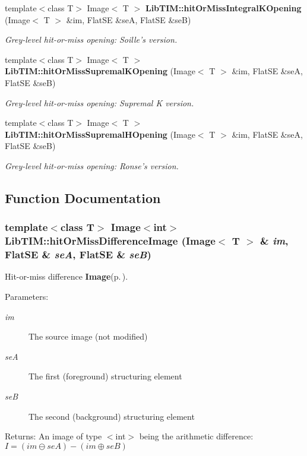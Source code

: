 \begin{CompactItemize}
template$<$class T$>$ Image$<$ T $>$ {\bf Lib\-TIM::hit\-Or\-Miss\-Integral\-KOpening} (Image$<$ T $>$ \&im, Flat\-SE \&se\-A, Flat\-SE \&se\-B)
\begin{CompactList}\small\item\em Grey-level hit-or-miss opening: Soille's version. \item\end{CompactList}\item 
template$<$class T$>$ Image$<$ T $>$ {\bf Lib\-TIM::hit\-Or\-Miss\-Supremal\-KOpening} (Image$<$ T $>$ \&im, Flat\-SE \&se\-A, Flat\-SE \&se\-B)
\begin{CompactList}\small\item\em Grey-level hit-or-miss opening: Supremal K version. \item\end{CompactList}\item 
template$<$class T$>$ Image$<$ T $>$ {\bf Lib\-TIM::hit\-Or\-Miss\-Supremal\-HOpening} (Image$<$ T $>$ \&im, Flat\-SE \&se\-A, Flat\-SE \&se\-B)
\begin{CompactList}\small\item\em Grey-level hit-or-miss opening: Ronse's version. \item\end{CompactList}\end{CompactItemize}


\subsection{Function Documentation}
\subsubsection{\setlength{\rightskip}{0pt plus 5cm}template$<$class T$>$ Image$<$int$>$ Lib\-TIM::hit\-Or\-Miss\-Difference\-Image (Image$<$ T $>$ \& {\em im}, Flat\-SE \& {\em se\-A}, Flat\-SE \& {\em se\-B})}\label{group__interval_ga0}


Hit-or-miss difference {\bf Image}{\rm (p.\,\pageref{classLibTIM_1_1Image})}. 

\begin{Desc}
\item[Parameters:]
\begin{description}
\item[{\em im}]The source image (not modified) \item[{\em se\-A}]The first (foreground) structuring element \item[{\em se\-B}]The second (background) structuring element \end{description}
\end{Desc}
\begin{Desc}
\item[Returns:]An image of type $<$int$>$ being the arithmetic difference: $I=(im\ominus seA)-(im\oplus seB) $\end{Desc}
